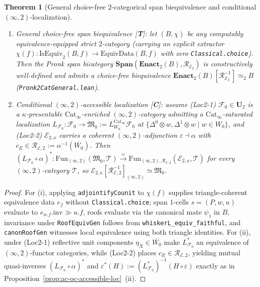 \documentclass[11pt]{article}
\theoremstyle{plain}
\newtheorem{theorem}{Theorem}[section]
\theoremstyle{definition}
\newcommand{\cF}{\mathcal{F}}
\newcommand{\fM}{\mathfrak{M}}
\newcommand{\Fun}{\mathrm{Fun}}
\newcommand{\Cat}{\mathrm{Cat}}
\newcommand{\cE}{\mathcal{E}}
\begin{document}
\begin{theorem}[General choice-free $2$-categorical span biequivalence and conditional $(\infty, 2)$-localization]\label{thm:ac-oc-2cat-loc}
\begin{enumerate}[nosep,label=(\roman*)]
\item \emph{General choice-free span biequivalence \textup{[\textbf{T}]}}: let $(B, \chi)$ be any computably equivalence-equipped strict $2$-category (carrying an explicit extractor $\chi(f) : \mathrm{IsEquiv}_2(B, f) \to \mathrm{EquivData}(B, f)$ with zero \texttt{Classical.choice}). Then the Pronk span bicategory $\mathbf{Span}(\mathbf{Enact}_2(B), \mathcal{R}_{\cE_2})$ is constructively well-defined and admits a choice-free biequivalence $\mathbf{Enact}_2(B)[\mathcal{R}_{\cE_2}^{-1}] \simeq_2 B$ (\texttt{Pronk2CatGeneral.lean}).
\item \emph{Conditional $(\infty, 2)$-accessible localization \textup{[\textbf{C}]}}: assume \textup{(Loc2-1)} $\cF_0 \in \mathbf{U}_2$ is a $\kappa$-presentable $\Cat_\infty$-enriched $(\infty, 2)$-category admitting a $\Cat_\infty$-saturated localization $L_{\cF_0} : \cF_0 \to \fM_0 := L_{W_0}^{\Cat_\infty}\cF_0$ at $\{\Delta^0 \otimes w, \Delta^1 \otimes w \mid w \in W_0\}$, and \textup{(Loc2-2)} $\cE_{2,\kappa}$ carries a coherent $(\infty, 2)$-adjunction $\varepsilon \dashv \alpha$ with $c_E \in \mathcal{R}_{\cE, 2} := \alpha^{-1}(\overline{W_0})$. Then $(L_{\cF_0} \circ \alpha)^* : \Fun_{(\infty,2)}(\fM_0, \mathcal{T}) \xrightarrow{\simeq} \Fun_{(\infty,2), \mathcal{R}_{\cE,2}}(\cE_{2,\kappa}, \mathcal{T})$ for every $(\infty, 2)$-category $\mathcal{T}$, so $\cE_{2,\kappa}[\mathcal{R}_{\cE,2}^{-1}]_{(\infty,2)} \simeq \fM_0$.
\end{enumerate}
\end{theorem}
\begin{proof}
For (i), applying \texttt{adjointifyCounit} to $\chi(f)$ supplies triangle-coherent equivalence data $e_f$ without \texttt{Classical.choice}; span $1$-cells $s = (P, w, u)$ evaluate to $e_{w.f}.\mathrm{inv} \gg u.f$, roofs evaluate via the canonical mate $\psi_1$ in $B$, invariance under \texttt{RoofEquivGen} follows from \texttt{whiskerL\_equiv\_faithful}, and \texttt{canonRoofGen} witnesses local equivalence using both triangle identities. For (ii), under \textup{(Loc2-1)} reflective unit components $\eta_X \in \overline{W_0}$ make $L_{\cF_0}^*$ an equivalence of $(\infty,2)$-functor categories, while \textup{(Loc2-2)} places $c_E \in \mathcal{R}_{\cE,2}$, yielding mutual quasi-inverses $(L_{\cF_0} \circ \alpha)^*$ and $\varepsilon^*(H) := (L_{\cF_0}^*)^{-1}(H \circ \varepsilon)$ exactly as in Proposition~\ref{prop:ac-oc-accessible-loc}~(ii).
\end{proof}
\end{document}
